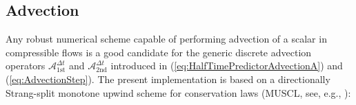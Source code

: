 \documentclass{ametsoc}
\newcommand{\sblue}[1]{\textcolor{sblue}{#1}}
\newcommand{\revision}[1]{\sblue{#1}}
\theoremstyle{definition}
\newcommand{\eq}[1]{(\ref{#1})}
\newcommand{\dt}{\Delta t}
\begin{document}

\subsection{Advection}
\label{ssec:Advection}

Any robust numerical scheme capable of performing advection of a scalar in
compressible flows is a good candidate for the generic discrete
advection operators $\mathcal{A}_{\text{1st}}^{\dt}$ and 
$\mathcal{A}_{\text{2nd}}^{\dt}$ introduced in \eq{eq:HalfTimePredictorAdvectionA}
and \eq{eq:AdvectionStep}. 
The present implementation is based on a directionally \revision{Strang-}split 
monotone upwind scheme for conservation laws (MUSCL, see, e.g.,
\citet{vanLeer2006}): 
\end{document}

